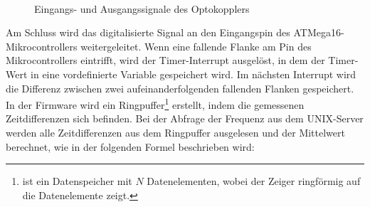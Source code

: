 \begin{figure}[ht!]
     \begin{center}
        \\ %
%
    \end{center}
    \caption{Eingangs- und Ausgangssignale des Optokopplers}%
   \label{fig:signals}
\end{figure}

Am Schluss wird das digitalisierte Signal an den Eingangspin des ATMega16-Mikrocontrollers weitergeleitet. Wenn eine fallende Flanke am Pin des Mikrocontrollers eintrifft, wird der Timer-Interrupt ausgelöst, in dem der Timer-Wert in eine vordefinierte Variable gespeichert wird. Im nächsten Interrupt wird die Differenz zwischen zwei aufeinanderfolgenden fallenden Flanken gespeichert. In der Firmware wird ein Ringpuffer\footnote{ist ein Datenspeicher mit $N$ Datenelementen, wobei der Zeiger ringförmig auf die Datenelemente zeigt.} erstellt, indem die gemessenen Zeitdifferenzen sich befinden. Bei der Abfrage der Frequenz aus dem UNIX-Server werden alle Zeitdifferenzen aus dem Ringpuffer ausgelesen und der Mittelwert berechnet, wie in der folgenden Formel beschrieben wird:


